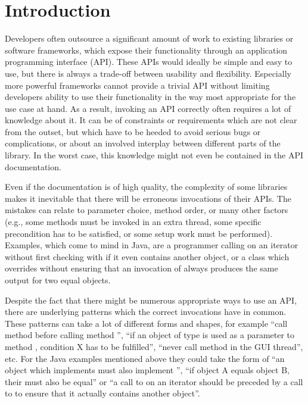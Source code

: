 \chapter{Introduction}\label{ch:intro}

Developers often outsource a significant amount of work to existing libraries or software frameworks, which expose their functionality through an application programming interface (API).
These APIs would ideally be simple and easy to use, but there is always a trade-off between usability and flexibility.
Especially more powerful frameworks cannot provide a trivial API without limiting developers ability to use their functionality in the way most appropriate for the use case at hand.
As a result, invoking an API correctly often requires a lot of knowledge about it.
It can be of constraints or requirements which are not clear from the outset, but which have to be heeded to avoid serious bugs or complications, or about an involved interplay between different parts of the library.
In the worst case, this knowledge might not even be contained in the API documentation.

Even if the documentation is of high quality, the complexity of some libraries makes it inevitable that there will be erroneous invocations of their APIs.
The mistakes can relate to parameter choice, method order, or many other factors (e.g., some methods must be invoked in an extra thread, some specific precondition has to be satisfied, or some setup work must be performed).
Examples, which come to mind in Java, are a programmer calling  on an iterator without first checking with  if it even contains another object, or a class which overrides  without ensuring that an invocation of  always produces the same output for two equal objects.

Despite the fact that there might be numerous appropriate ways to use an API, there are underlying patterns which the correct invocations have in common.
These patterns can take a lot of different forms and shapes, for example ``call method  before calling method '', ``if an object of type  is used as a parameter to method , condition X has to be fulfilled'', ``never call method  in the GUI thread'', etc.
For the Java examples mentioned above they could take the form of ``an object which implements  must also implement '', ``if object A equals object B, their  must also be equal'' or ``a call to  on an iterator should be preceded by a call to  to ensure that it actually contains another object''.

